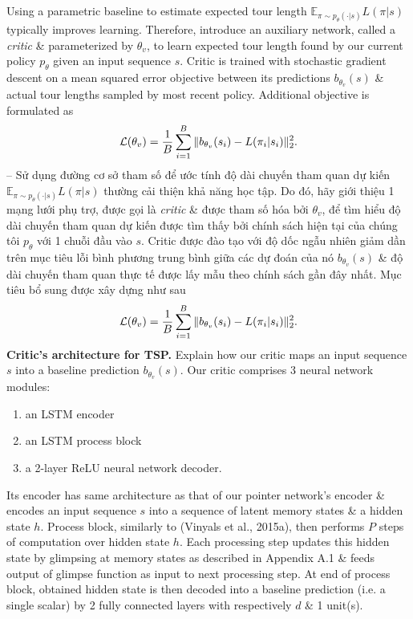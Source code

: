 \documentclass{article}
\begin{document}
\begin{itemize}
    Using a parametric baseline to estimate expected tour length $\mathbb{E}_{\pi\sim p_\theta(\cdot|s)} L(\pi|s)$ typically improves learning. Therefore, introduce an auxiliary network, called a {\it critic} \& parameterized by $\theta_v$, to learn expected tour length found by our current policy $p_\theta$ given an input sequence $s$. Critic is trained with stochastic gradient descent on a mean squared error objective between its predictions $b_{\theta_v}(s)$ \& actual tour lengths sampled by most recent policy. Additional objective is formulated as
    \begin{equation*}
        {\cal L}(\theta_v) = \frac{1}{B}\sum_{i=1}^B \|b_{\theta_v}(s_i) - L(\pi_i|s_i)\|_2^2.
    \end{equation*}
    -- Sử dụng đường cơ sở tham số để ước tính độ dài chuyến tham quan dự kiến $\mathbb{E}_{\pi\sim p_\theta(\cdot|s)} L(\pi|s)$ thường cải thiện khả năng học tập. Do đó, hãy giới thiệu 1 mạng lưới phụ trợ, được gọi là {\it critic} \& được tham số hóa bởi $\theta_v$, để tìm hiểu độ dài chuyến tham quan dự kiến được tìm thấy bởi chính sách hiện tại của chúng tôi $p_\theta$ với 1 chuỗi đầu vào $s$. Critic được đào tạo với độ dốc ngẫu nhiên giảm dần trên mục tiêu lỗi bình phương trung bình giữa các dự đoán của nó $b_{\theta_v}(s)$ \& độ dài chuyến tham quan thực tế được lấy mẫu theo chính sách gần đây nhất. Mục tiêu bổ sung được xây dựng như sau
    \begin{equation*}
        {\cal L}(\theta_v) = \frac{1}{B}\sum_{i=1}^B \|b_{\theta_v}(s_i) - L(\pi_i|s_i)\|_2^2.
    \end{equation*}
    {\bf Critic's architecture for TSP.} Explain how our critic maps an input sequence $s$ into a baseline prediction $b_{\theta_v}(s)$. Our critic comprises 3 neural network modules:
    \begin{enumerate}
        \item an LSTM encoder
        \item an LSTM process block
        \item a 2-layer ReLU neural network decoder.
    \end{enumerate}
    Its encoder has same architecture as that of our pointer network's encoder \& encodes an input sequence $s$ into a sequence of latent memory states \& a hidden state $h$. Process block, similarly to (Vinyals et al., 2015a), then performs $P$ steps of computation over hidden state $h$. Each processing step updates this hidden state by glimpsing at memory states as described in Appendix A.1 \& feeds output of glimpse function as input to next processing step. At end of process block, obtained hidden state is then decoded into a baseline prediction (i.e. a single scalar) by 2 fully connected layers with respectively $d$ \& 1 unit(s).
    

\end{itemize}
\end{document}
